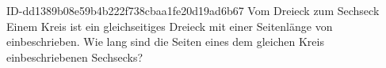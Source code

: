 \begin{exercise}
      {ID-dd1389b08e59b4b222f738cbaa1fe20d19ad6b67}
      {Vom Dreieck zum Sechseck}
  \ifproblem\problem
    Einem Kreis ist ein gleichseitiges Dreieck mit einer Seitenlänge von
     einbeschrieben. Wie lang sind die Seiten eines dem gleichen
    Kreis einbeschriebenen Sechsecks?
  \fi
\end{exercise}
